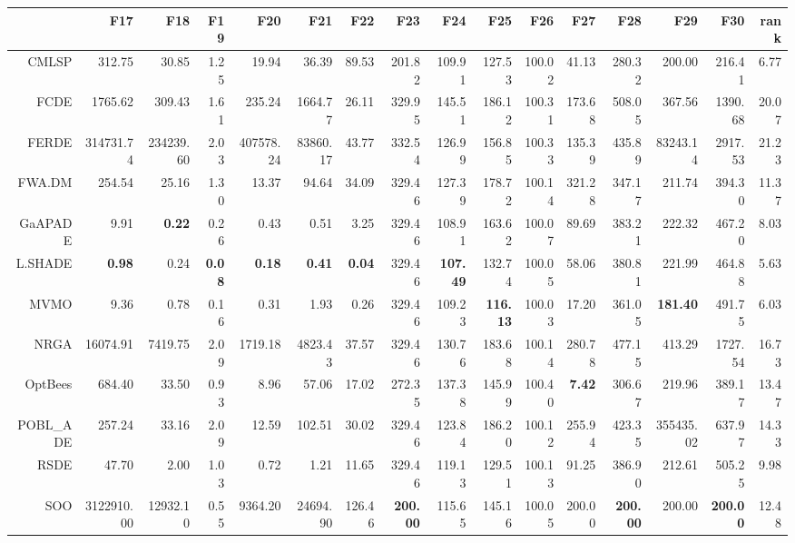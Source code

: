 \begin{table}[h!]
\centering
\begingroup\tiny
\begin{tabular}{rrrrrrrrrrrrrrrr}
  \hline
 & F17 & F18 & F19 & F20 & F21 & F22 & F23 & F24 & F25 & F26 & F27 & F28 & F29 & F30 & rank \\ 
  \hline
CMLSP & 312.75 & 30.85 & 1.25 & 19.94 & 36.39 & 89.53 & 201.82 & 109.91 & 127.53 & 100.02 & 41.13 & 280.32 & 200.00 & 216.41 & 6.77 \\ 
  FCDE & 1765.62 & 309.43 & 1.61 & 235.24 & 1664.77 & 26.11 & 329.95 & 145.51 & 186.12 & 100.31 & 173.68 & 508.05 & 367.56 & 1390.68 & 20.07 \\ 
  FERDE & 314731.74 & 234239.60 & 2.03 & 407578.24 & 83860.17 & 43.77 & 332.54 & 126.99 & 156.85 & 100.33 & 135.39 & 435.89 & 83243.14 & 2917.53 & 21.23 \\ 
  FWA.DM & 254.54 & 25.16 & 1.30 & 13.37 & 94.64 & 34.09 & 329.46 & 127.39 & 178.72 & 100.14 & 321.28 & 347.17 & 211.74 & 394.30 & 11.37 \\ 
  GaAPADE & 9.91 & \textbf{0.22} & 0.26 & 0.43 & 0.51 & 3.25 & 329.46 & 108.91 & 163.62 & 100.07 & 89.69 & 383.21 & 222.32 & 467.20 & 8.03 \\ 
  L.SHADE & \textbf{0.98} & 0.24 & \textbf{0.08} & \textbf{0.18} & \textbf{0.41} & \textbf{0.04} & 329.46 & \textbf{107.49} & 132.74 & 100.05 & 58.06 & 380.81 & 221.99 & 464.88 & 5.63 \\ 
  MVMO & 9.36 & 0.78 & 0.16 & 0.31 & 1.93 & 0.26 & 329.46 & 109.23 & \textbf{116.13} & 100.03 & 17.20 & 361.05 & \textbf{181.40} & 491.75 & 6.03 \\ 
  NRGA & 16074.91 & 7419.75 & 2.09 & 1719.18 & 4823.43 & 37.57 & 329.46 & 130.76 & 183.68 & 100.14 & 280.78 & 477.15 & 413.29 & 1727.54 & 16.73 \\ 
  OptBees & 684.40 & 33.50 & 0.93 & 8.96 & 57.06 & 17.02 & 272.35 & 137.38 & 145.99 & 100.40 & \textbf{7.42} & 306.67 & 219.96 & 389.17 & 13.47 \\ 
  POBL\_ADE & 257.24 & 33.16 & 2.09 & 12.59 & 102.51 & 30.02 & 329.46 & 123.84 & 186.20 & 100.12 & 255.94 & 423.35 & 355435.02 & 637.97 & 14.33 \\ 
  RSDE & 47.70 & 2.00 & 1.03 & 0.72 & 1.21 & 11.65 & 329.46 & 119.13 & 129.51 & 100.13 & 91.25 & 386.90 & 212.61 & 505.25 & 9.98 \\ 
  SOO & 3122910.00 & 12932.10 & 0.55 & 9364.20 & 24694.90 & 126.46 & \textbf{200.00} & 115.65 & 145.16 & 100.05 & 200.00 & \textbf{200.00} & 200.00 & \textbf{200.00} & 12.48 \\ 

\end{tabular}
\end{table}
